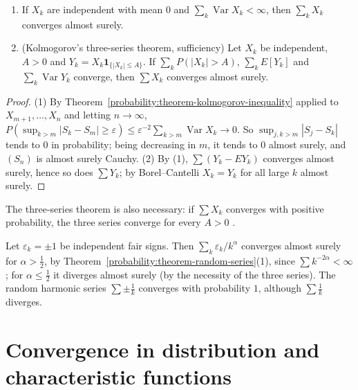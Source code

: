 \begin{theorem}\label{probability:theorem-random-series}
\begin{enumerate}
\item If $X_k$ are independent with mean $0$ and $\sum_k\operatorname{Var}X_k < \infty$, then $\sum_kX_k$ converges almost surely.
\item (Kolmogorov's three-series theorem, sufficiency) Let $X_k$ be independent, $A > 0$ and $Y_k = X_k\mathbf{1}_{\{|X_k| \leq A\}}$. If $\sum_kP(|X_k| > A)$, $\sum_kE[Y_k]$ and $\sum_k\operatorname{Var}Y_k$ converge, then $\sum X_k$
converges almost surely.
\end{enumerate}
\end{theorem}

\begin{proof}
(1) By Theorem~\ref{probability:theorem-kolmogorov-inequality} applied to $X_{m+1}, \ldots, X_n$ and letting $n \to \infty$, $P(\sup_{k > m}|S_k - S_m| \geq \varepsilon) \leq \varepsilon^{-2}\sum_{k > m}\operatorname{Var}X_k \to 0$. So
$\sup_{j,k > m}|S_j - S_k|$ tends to $0$ in probability; being decreasing in $m$, it tends to $0$ almost surely, and $(S_n)$ is almost surely Cauchy. (2) By (1), $\sum(Y_k - EY_k)$ converges almost surely, hence so does $\sum Y_k$;
by Borel--Cantelli $X_k = Y_k$ for all large $k$ almost surely.
\end{proof}

The three-series theorem is also necessary: if $\sum X_k$ converges with positive probability, the three series converge for every $A > 0$ \cite{durrett-probability}.

\begin{example}\label{probability:example-random-harmonic}
Let $\varepsilon_k = \pm1$ be independent fair signs. Then $\sum_k\varepsilon_k/k^\alpha$ converges almost surely for $\alpha > \frac12$, by Theorem~\ref{probability:theorem-random-series}(1), since $\sum k^{-2\alpha} < \infty$; for
$\alpha \leq \frac12$ it diverges almost surely (by the necessity of the three series). The random harmonic series $\sum\pm\frac1k$ converges with probability $1$, although $\sum\frac1k$ diverges.
\end{example}

\section{Convergence in distribution and characteristic functions}\label{probability:section-characteristic-functions}


